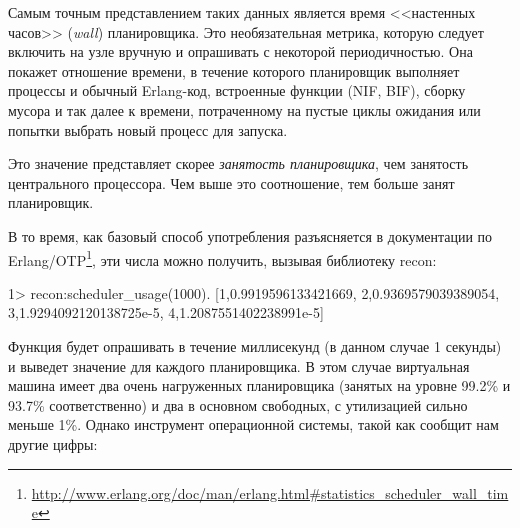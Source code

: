 \documentclass[11pt, oneside]{book}   	%
\begin{document}
Самым точным представлением таких данных является время <<настенных часов>> (\emph{wall}) планировщика. Это необязательная метрика, которую следует включить на узле вручную и опрашивать с некоторой периодичностью. Она покажет отношение времени, в течение которого планировщик выполняет процессы и обычный Erlang-код, встроенные функции (NIF, BIF), сборку мусора и так далее к времени, потраченному на пустые циклы ожидания или попытки выбрать новый процесс для запуска.

Это значение представляет скорее \emph{занятость планировщика}, чем занятость центрального процессора. Чем выше это соотношение, тем больше занят планировщик.

В то время, как базовый способ употребления разъясняется в документации по Erlang/OTP\footnote{\href{http://www.erlang.org/doc/man/erlang.html\#statistics\_scheduler\_wall\_time}{http://www.erlang.org/doc/man/erlang.html\#statistics\_scheduler\_wall\_time}}, эти числа можно получить, вызывая библиотеку recon:

\begin{VerbatimEshell}
1> recon:scheduler_usage(1000).
[{1,0.9919596133421669},
 {2,0.9369579039389054},
 {3,1.9294092120138725e-5},
 {4,1.2087551402238991e-5}]
\end{VerbatimEshell}

Функция  будет опрашивать в течение  миллисекунд (в данном случае 1 секунды) и выведет значение для каждого планировщика. В этом случае виртуальная машина имеет два очень нагруженных планировщика (занятых на уровне 99.2\% и 93.7\% соответственно) и два в основном свободных, с утилизацией сильно меньше 1\%. Однако инструмент операционной системы, такой как  сообщит нам другие цифры:
\end{document}
